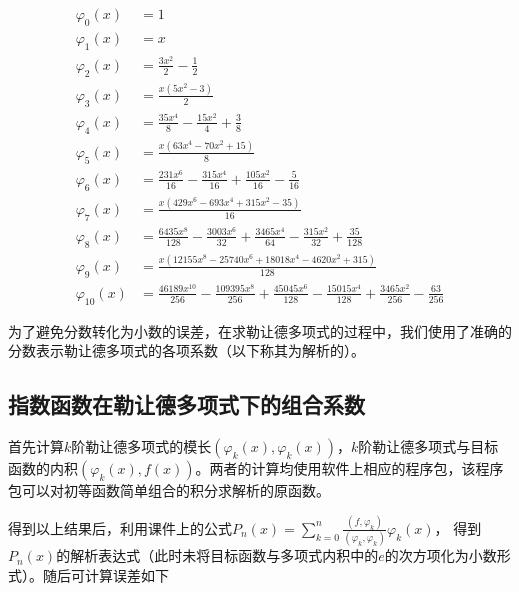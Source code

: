 \documentclass{article}
\begin{document}
    \begin{align*}
    	\varphi_0(x) &= 1\\
    	\varphi_1(x) &= x \\
    	\varphi_2(x) &=\frac{3 x^{2}}{2} - \frac{1}{2}\\
    	\varphi_3(x) &=\frac{x \left(5 x^{2} - 3\right)}{2}\\
    	\varphi_4(x) &=\frac{35 x^{4}}{8} - \frac{15 x^{2}}{4} + \frac{3}{8}\\
    	\varphi_5(x) &=\frac{x \left(63 x^{4} - 70 x^{2} + 15\right)}{8}\\
    	\varphi_6(x) &=\frac{231 x^{6}}{16} - \frac{315 x^{4}}{16} + \frac{105 x^{2}}{16} - \frac{5}{16}\\
    	\varphi_7(x) &=\frac{x \left(429 x^{6} - 693 x^{4} + 315 x^{2} - 35\right)}{16}\\
    	\varphi_8(x) &=\frac{6435 x^{8}}{128} - \frac{3003 x^{6}}{32} + \frac{3465 x^{4}}{64} - \frac{315 x^{2}}{32} + \frac{35}{128}\\
    	\varphi_9(x) &=\frac{x \left(12155 x^{8} - 25740 x^{6} + 18018 x^{4} - 4620 x^{2} + 315\right)}{128}\\
    	\varphi_{10}(x) &=\frac{46189 x^{10}}{256} - \frac{109395 x^{8}}{256} + \frac{45045 x^{6}}{128} - \frac{15015 x^{4}}{128} + \frac{3465 x^{2}}{256} - \frac{63}{256}
    \end{align*}
    
    为了避免分数转化为小数的误差，在求勒让德多项式的过程中，我们使用了准确的分数表示勒让德多项式的各项系数（以下称其为解析的）。
    
    \subsection{指数函数在勒让德多项式下的组合系数}
    
    首先计算$k$阶勒让德多项式的模长$(\varphi_k(x),\varphi_k(x))$，$k$阶勒让德多项式与目标函数的内积$(\varphi_k(x),f(x))$。两者的计算均使用软件上相应的程序包，该程序包可以对初等函数简单组合的积分求解析的原函数。
    
    得到以上结果后，利用课件上的公式$P_n(x)=\sum_{k=0}^{n}\frac{(f,\varphi_k)}{(\varphi_k,\varphi_k)}\varphi_k(x)$，
    得到$P_n(x)$的解析表达式（此时未将目标函数与多项式内积中的$e$的次方项化为小数形式）。随后可计算误差如下
    
\end{document}
